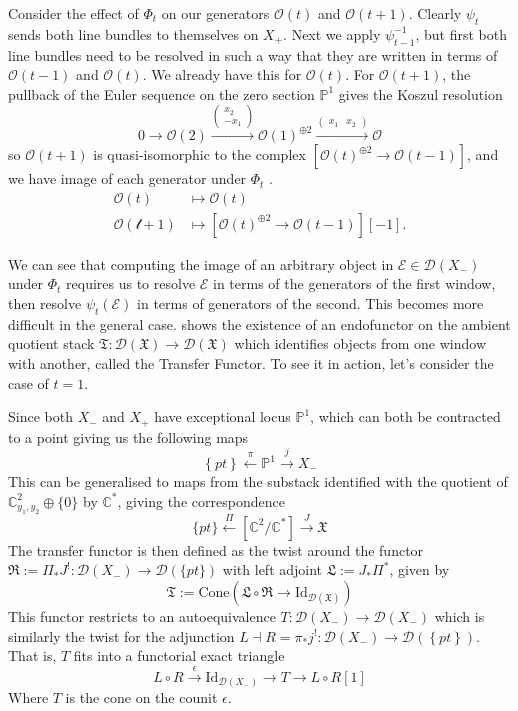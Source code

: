 Consider the effect of $\Phi_t$ on our generators $\mathcal{O}(t)$ and $\mathcal{O}(t+1)$. Clearly $\psi_t$ sends both line bundles to themselves on $X_{+}$. Next we apply $\psi_{t-1}^{-1}$, but first both line bundles need to be resolved in such a way that they are written in terms of $\mathcal{O}(t-1)$ and $\mathcal{O}(t)$. We already have this for $\mathcal{O}(t)$. For $\mathcal{O}(t+1)$, the pullback of the Euler sequence on the zero section $\mathbb{P}^1$ gives the Koszul resolution $$
 0\to \mathcal{O}(2)\xrightarrow{\begin{pmatrix}x_2\\-x_{1}\end{pmatrix}}\mathcal{O}(1)^{\oplus 2}\xrightarrow{\begin{pmatrix}x_{1}&x_2\end{pmatrix}} \mathcal{O}
$$so $\mathcal{O}(t+1)$ is quasi-isomorphic to the complex $\left[ \mathcal{O}(t)^{\oplus{2}}\to \mathcal{O}(t-1) \right]$, and we have image of each generator under $\Phi_t$ . 
\begin{align*}
\mathcal{O}(t) &\mapsto \mathcal{O}(t)\\
\mathcal{\mathcal{O}(t+1)}&\mapsto\left[ \mathcal{O}(t)^{\oplus 2}\to \mathcal{O}(t-1) \right][-1] .
\end{align*}

We can see that computing the image of an arbitrary object in $\mathcal{E} \in \mathcal{D}(X_-)$ under $\Phi_t$ requires us to resolve $\mathcal{E}$ in terms of the generators of the first window, then resolve $\psi_{t}(\mathcal{E})$ in terms of generators of the second. This becomes more difficult in the general case.  \cite*{donovan_window_2014} shows the existence of an endofunctor on the ambient quotient stack $\mathfrak{T}: \mathcal{D}(\mathfrak{X})\to \mathcal{D}(\mathfrak{X})$ which identifies objects from one window with another, called the Transfer Functor. To see it in action, let's consider the case of $t = 1$.

Since both $X_-$ and $X_+$ have exceptional locus $\mathbb{P}^1$, which can both be contracted to a point giving us the following maps $$
\left\{ pt \right\} \xleftarrow{\pi} \mathbb{P}^{1}\xrightarrow{j} X_{-}
$$
This can be generalised to maps from the substack identified with the quotient of $\mathbb{C}^{2}_{y_{1}, y_{2}} \oplus \{ 0 \}$ by $\mathbb{C}^*$, giving the correspondence $$
\{ pt \}\xleftarrow{\Pi}[\mathbb{C}^{2}/\mathbb{C}^*] \xrightarrow{J} \mathfrak{X}
$$
The transfer functor is then defined as the twist around the functor $\mathfrak{R}:= \Pi_{*}J^{!}: \mathcal{D}(X_{-})\to \mathcal{D}(\{ pt \})$  with left adjoint $\mathfrak{L}:= J_{*}\Pi^{*}$, given by $$
\mathfrak{T}:= \mathrm{Cone}\left(\mathfrak{L}\circ \mathfrak{R} \to \mathrm{Id}_{\mathcal{D}(\mathfrak{X})} \right) 
$$
This functor restricts to an autoequivalence $T: \mathcal{D}(X_{-})\to \mathcal{D}(X_-)$ which is similarly the twist for the adjunction $L\dashv R= \pi_{*}j^{!} : \mathcal{D}(X_{-})\to \mathcal{D}(\left\{ pt \right\})$. That is, $T$ fits into a functorial exact triangle $$
L\circ R \xrightarrow{\epsilon} \mathrm{Id}_{\mathcal{D}(X_{-})} \to T\to L\circ R[1]
$$Where $T$ is the cone on the counit $\epsilon$. 


